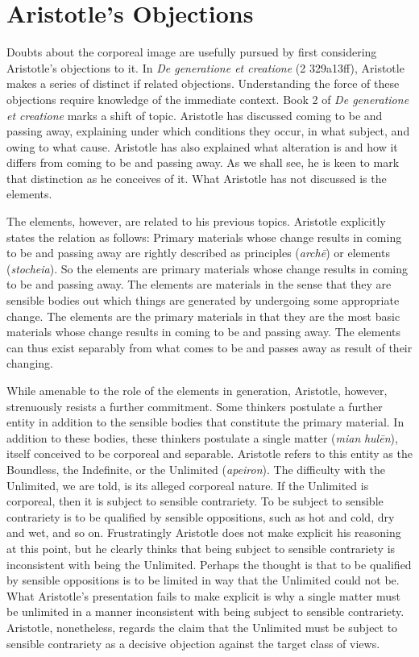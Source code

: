 
\section{Aristotle's Objections} %
\label{sec:aristotle_s_objections}

Doubts about the corporeal image are usefully pursued by first considering Aristotle's objections to it. In \emph{De generatione et creatione} (2 329a13ff), Aristotle makes a series of distinct if related objections. Understanding the force of these objections require knowledge of the immediate context. Book 2 of \emph{De generatione et creatione} marks a shift of topic. Aristotle has discussed coming to be and passing away, explaining under which conditions they occur, in what subject, and owing to what cause. Aristotle has also explained what alteration is and how it differs from coming to be and passing away. As we shall see, he is keen to mark that distinction as he conceives of it. What Aristotle has not discussed is the elements. 

The elements, however, are related to his previous topics. Aristotle explicitly states the relation as follows: Primary materials whose change results in coming to be and passing away are rightly described as principles (\emph{archē}) or elements (\emph{stocheia}). So the elements are primary materials whose change results in coming to be and passing away. The elements are materials in the sense that they are sensible bodies out which things are generated by undergoing some appropriate change. The elements are the primary materials in that they are the most basic materials whose change results in coming to be and passing away. The elements can thus exist separably from what comes to be and passes away as result of their changing.

While amenable to the role of the elements in generation, Aristotle, however, strenuously resists a further commitment. Some thinkers postulate a further entity in addition to the sensible bodies that constitute the primary material. In addition to these bodies, these thinkers postulate a single matter (\emph{mian} \emph{hulēn}), itself conceived to be corporeal and separable. Aristotle refers to this entity as the Boundless, the Indefinite,  or the Unlimited (\emph{apeiron}). The difficulty with the Unlimited, we are told, is its alleged corporeal nature. If the Unlimited is corporeal, then it is subject to sensible contrariety. To be subject to sensible contrariety is to be qualified by sensible oppositions, such as hot and cold, dry and wet, and so on. Frustratingly Aristotle does not make explicit his reasoning at this point, but he clearly thinks that being subject to sensible contrariety is inconsistent with being the Unlimited. Perhaps the thought is that to be qualified by sensible oppositions is to be limited in way that the Unlimited could not be. What Aristotle's presentation fails to make explicit is why a single matter must be unlimited in a manner inconsistent with being subject to sensible contrariety. Aristotle, nonetheless, regards the claim that the Unlimited must be subject to sensible contrariety as a decisive objection against the target class of views.

